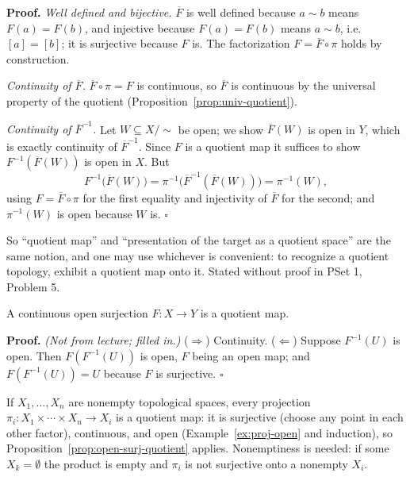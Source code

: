 \documentclass[11pt]{report}
\makeatletter
\newcounter{thmcounter}[section]
\newcounter{excounter}[section]
\renewenvironment{proof}[1][Proof]{\noindent\textbf{#1.} }{\hfill$\square$\par\vspace{5pt}}
\newcommand{\thmlabel}[1]{\edef\@currentlabel{\arabic{section}.\arabic{thmcounter}}\label{#1}}
\newcommand{\exlabel}[1]{\edef\@currentlabel{\arabic{section}.\arabic{excounter}}\label{#1}}
\makeatother
\begin{document}
\begin{proof}
\emph{Well defined and bijective.} $\overline{F}$ is well defined because $a \sim b$ means $F(a) = F(b)$, and injective because $F(a) = F(b)$ means $a \sim b$, i.e.\ $[a] = [b]$; it is surjective because $F$ is. The factorization $F = \overline{F} \circ \pi$ holds by construction.

\emph{Continuity of $\overline{F}$.} $\overline{F} \circ \pi = F$ is continuous, so $\overline{F}$ is continuous by the universal property of the quotient (Proposition~\ref{prop:univ-quotient}).

\emph{Continuity of $\overline{F}^{-1}$.} Let $W \subseteq X/{\sim}$ be open; we show $\overline{F}(W)$ is open in $Y$, which is exactly continuity of $\overline{F}^{-1}$. Since $F$ is a quotient map it suffices to show $F^{-1}(\overline{F}(W))$ is open in $X$. But
\[
F^{-1}\big(\overline{F}(W)\big) = \pi^{-1}\big(\overline{F}^{-1}(\overline{F}(W))\big) = \pi^{-1}(W),
\]
using $F = \overline{F} \circ \pi$ for the first equality and injectivity of $\overline{F}$ for the second; and $\pi^{-1}(W)$ is open because $W$ is.
\end{proof}

\begin{rembox}\label{rem:new-spaces-3}
So ``quotient map'' and ``presentation of the target as a quotient space'' are the same notion, and one may use whichever is convenient: to recognize a quotient topology, exhibit a quotient map onto it. Stated without proof in PSet 1, Problem 5.
\end{rembox}

\begin{propbox}\thmlabel{prop:open-surj-quotient}
A continuous open surjection $F : X \to Y$ is a quotient map.
\end{propbox}

\begin{proof}
\textit{(Not from lecture; filled in.)} ($\Rightarrow$) Continuity. ($\Leftarrow$) Suppose $F^{-1}(U)$ is open. Then $F(F^{-1}(U))$ is open, $F$ being an open map; and $F(F^{-1}(U)) = U$ because $F$ is surjective.
\end{proof}

\begin{exbox}\exlabel{ex:proj-quotient}
If $X_1, \ldots, X_n$ are nonempty topological spaces, every projection $\pi_i : X_1 \times \cdots \times X_n \to X_i$ is a quotient map: it is surjective (choose any point in each other factor), continuous, and open (Example~\ref{ex:proj-open} and induction), so Proposition~\ref{prop:open-surj-quotient} applies. Nonemptiness is needed: if some $X_k = \emptyset$ the product is empty and $\pi_i$ is not surjective onto a nonempty $X_i$.
\end{exbox}
\end{document}
